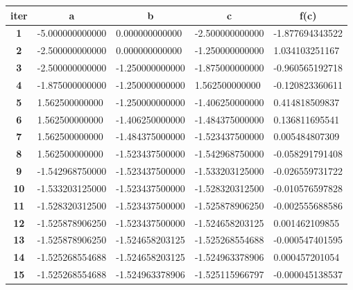 \documentclass[a4paper, 12pt]{report}
\begin{document}
\begin{table}[h]
\begin{tabular}{|l|l|l|l|l|}
\hline
\multicolumn{1}{|c|}{\textbf{iter}} &
  \multicolumn{1}{c|}{\textbf{a}} &
  \multicolumn{1}{c|}{\textbf{b}} &
  \multicolumn{1}{c|}{\textbf{c}} &
  \multicolumn{1}{c|}{\textbf{f(c)}} \\ \hline
\multicolumn{1}{|c|}{\textbf{1}}  & -5.000000000000 & 0.000000000000  & -2.500000000000 & -1.877694343522 \\ \hline
\multicolumn{1}{|c|}{\textbf{2}}  & -2.500000000000 & 0.000000000000  & -1.250000000000 & 1.034103251167  \\ \hline
\multicolumn{1}{|c|}{\textbf{3}}  & -2.500000000000 & -1.250000000000 & -1.875000000000 & -0.960565192718  \\ \hline
\multicolumn{1}{|c|}{\textbf{4}}  & -1.875000000000 & -1.250000000000 & 1.562500000000  & -0.120823360611  \\ \hline
\multicolumn{1}{|c|}{\textbf{5}}  & 1.562500000000  & -1.250000000000 & -1.406250000000 & 0.414818509837  \\ \hline
\multicolumn{1}{|c|}{\textbf{6}}  & 1.562500000000  & -1.406250000000 & -1.484375000000 & 0.136811695541 \\ \hline
\multicolumn{1}{|c|}{\textbf{7}}  & 1.562500000000  & -1.484375000000 & -1.523437500000 & 0.005484807309  \\ \hline
\multicolumn{1}{|c|}{\textbf{8}}  & 1.562500000000  & -1.523437500000 & -1.542968750000 & -0.058291791408 \\ \hline
\multicolumn{1}{|c|}{\textbf{9}}  & -1.542968750000 & -1.523437500000 & -1.533203125000 & -0.026559731722  \\ \hline
\multicolumn{1}{|c|}{\textbf{10}} & -1.533203125000 & -1.523437500000 & -1.528320312500 & -0.010576597828 \\ \hline
\multicolumn{1}{|c|}{\textbf{11}} & -1.528320312500 & -1.523437500000 & -1.525878906250 & -0.002555688586 \\ \hline
\multicolumn{1}{|c|}{\textbf{12}} & -1.525878906250 & -1.523437500000 & -1.524658203125 & 0.001462109855 \\ \hline
\multicolumn{1}{|c|}{\textbf{13}} & -1.525878906250 & -1.524658203125 & -1.525268554688 & -0.000547401595 \\ \hline
\multicolumn{1}{|c|}{\textbf{14}} & -1.525268554688 & -1.524658203125 & -1.524963378906 & 0.000457201054  \\ \hline
\multicolumn{1}{|c|}{\textbf{15}} & -1.525268554688 & -1.524963378906 & -1.525115966797 & -0.000045138537  \\ \hline

\end{tabular}
\end{table}
\end{document}
